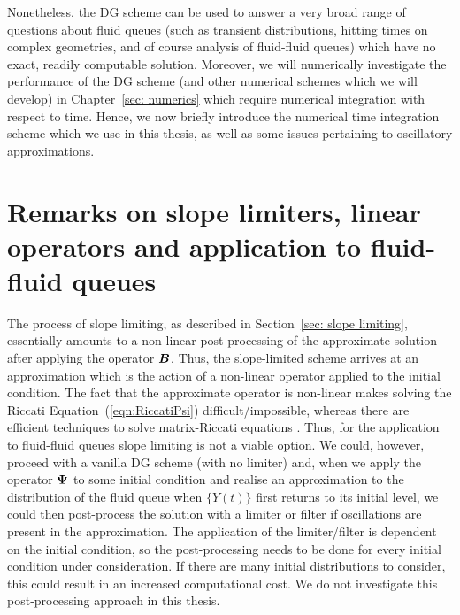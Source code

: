 Nonetheless, the DG scheme can be used to answer a very broad range of questions about fluid queues (such as transient distributions, hitting times on complex geometries, and of course analysis of fluid-fluid queues) which have no exact, readily computable solution. Moreover, we will numerically investigate the performance of the DG scheme (and other numerical schemes which we will develop) in Chapter~\ref{sec: numerics} which require numerical integration with respect to time. Hence, we now briefly introduce the numerical time integration scheme which we use in this thesis, as well as some issues pertaining to oscillatory approximations. 

\section{Remarks on slope limiters, linear operators and application to fluid-fluid queues}\label{sec: limiting and linearity}
The process of slope limiting, as described in Section~\ref{sec: slope limiting}, essentially amounts to a non-linear post-processing of the approximate solution after applying the operator \(\boldsymbol B\). Thus, the slope-limited scheme arrives at an approximation which is the action of a non-linear operator applied to the initial condition. The fact that the approximate operator is non-linear makes solving the Riccati Equation~(\ref{eqn:RiccatiPsi}) difficult/impossible, whereas there are efficient techniques to solve matrix-Riccati equations \cite{bot08}. Thus, for the application to fluid-fluid queues slope limiting is not a viable option. We could, however, proceed with a vanilla DG scheme (with no limiter) and, when we apply the operator \(\boldsymbol \Psi\) to some initial condition and realise an approximation to the distribution of the fluid queue when \(\{Y(t)\}\) first returns to its initial level, we could then post-process the solution with a limiter or filter if oscillations are present in the approximation. The application of the limiter/filter is dependent on the initial condition, so the post-processing needs to be done for every initial condition under consideration. If there are many initial distributions to consider, this could result in an increased computational cost. We do not investigate this post-processing approach in this thesis. 

